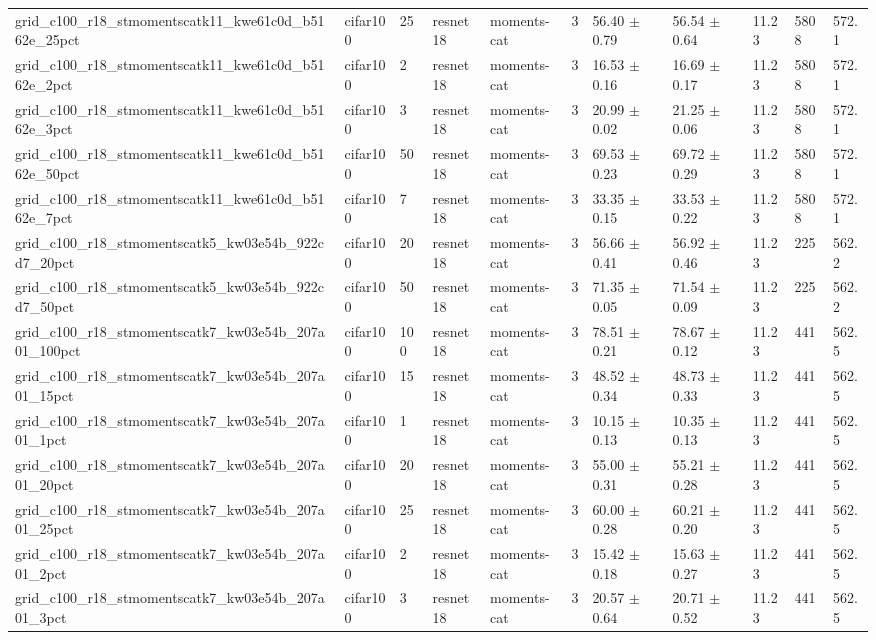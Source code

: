 \begin{tabular}{lllllllllll}
grid_c100_r18_stmomentscatk11_kwe61c0d_b5162e_25pct & cifar100 & 25 & resnet18 & moments-cat & 3 & 56.40 $\pm$ 0.79 & 56.54 $\pm$ 0.64 & 11.23 & 5808 & 572.1 \\
grid_c100_r18_stmomentscatk11_kwe61c0d_b5162e_2pct & cifar100 & 2 & resnet18 & moments-cat & 3 & 16.53 $\pm$ 0.16 & 16.69 $\pm$ 0.17 & 11.23 & 5808 & 572.1 \\
grid_c100_r18_stmomentscatk11_kwe61c0d_b5162e_3pct & cifar100 & 3 & resnet18 & moments-cat & 3 & 20.99 $\pm$ 0.02 & 21.25 $\pm$ 0.06 & 11.23 & 5808 & 572.1 \\
grid_c100_r18_stmomentscatk11_kwe61c0d_b5162e_50pct & cifar100 & 50 & resnet18 & moments-cat & 3 & 69.53 $\pm$ 0.23 & 69.72 $\pm$ 0.29 & 11.23 & 5808 & 572.1 \\
grid_c100_r18_stmomentscatk11_kwe61c0d_b5162e_7pct & cifar100 & 7 & resnet18 & moments-cat & 3 & 33.35 $\pm$ 0.15 & 33.53 $\pm$ 0.22 & 11.23 & 5808 & 572.1 \\
grid_c100_r18_stmomentscatk5_kw03e54b_922cd7_20pct & cifar100 & 20 & resnet18 & moments-cat & 3 & 56.66 $\pm$ 0.41 & 56.92 $\pm$ 0.46 & 11.23 & 225 & 562.2 \\
grid_c100_r18_stmomentscatk5_kw03e54b_922cd7_50pct & cifar100 & 50 & resnet18 & moments-cat & 3 & 71.35 $\pm$ 0.05 & 71.54 $\pm$ 0.09 & 11.23 & 225 & 562.2 \\
grid_c100_r18_stmomentscatk7_kw03e54b_207a01_100pct & cifar100 & 100 & resnet18 & moments-cat & 3 & 78.51 $\pm$ 0.21 & 78.67 $\pm$ 0.12 & 11.23 & 441 & 562.5 \\
grid_c100_r18_stmomentscatk7_kw03e54b_207a01_15pct & cifar100 & 15 & resnet18 & moments-cat & 3 & 48.52 $\pm$ 0.34 & 48.73 $\pm$ 0.33 & 11.23 & 441 & 562.5 \\
grid_c100_r18_stmomentscatk7_kw03e54b_207a01_1pct & cifar100 & 1 & resnet18 & moments-cat & 3 & 10.15 $\pm$ 0.13 & 10.35 $\pm$ 0.13 & 11.23 & 441 & 562.5 \\
grid_c100_r18_stmomentscatk7_kw03e54b_207a01_20pct & cifar100 & 20 & resnet18 & moments-cat & 3 & 55.00 $\pm$ 0.31 & 55.21 $\pm$ 0.28 & 11.23 & 441 & 562.5 \\
grid_c100_r18_stmomentscatk7_kw03e54b_207a01_25pct & cifar100 & 25 & resnet18 & moments-cat & 3 & 60.00 $\pm$ 0.28 & 60.21 $\pm$ 0.20 & 11.23 & 441 & 562.5 \\
grid_c100_r18_stmomentscatk7_kw03e54b_207a01_2pct & cifar100 & 2 & resnet18 & moments-cat & 3 & 15.42 $\pm$ 0.18 & 15.63 $\pm$ 0.27 & 11.23 & 441 & 562.5 \\
grid_c100_r18_stmomentscatk7_kw03e54b_207a01_3pct & cifar100 & 3 & resnet18 & moments-cat & 3 & 20.57 $\pm$ 0.64 & 20.71 $\pm$ 0.52 & 11.23 & 441 & 562.5 \\

\end{tabular}

